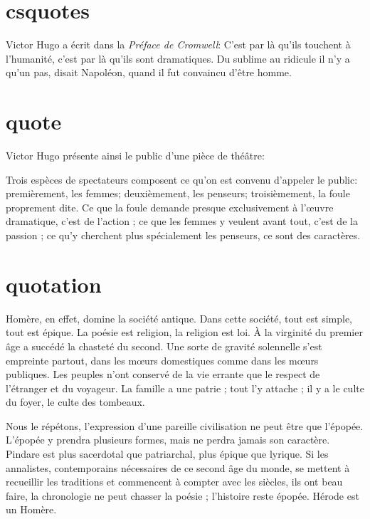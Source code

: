 \documentclass{book}
\begin{document}
\section{csquotes}

Victor Hugo a écrit dans la \emph{Préface de Cromwell}: C’est par là qu’ils touchent à l’humanité, c’est par là qu’ils sont dramatiques. Du sublime au ridicule il n’y a qu’un pas, disait Napoléon, quand il fut convaincu d’être homme.


\section{quote}


Victor Hugo présente ainsi le public d'une pièce de théâtre:

Trois espèces de spectateurs composent ce qu’on est convenu d’appeler le public: premièrement, les femmes; deuxièmement, les penseurs; troisièmement, la foule proprement dite. Ce que la foule demande presque exclusivement à l’œuvre dramatique, c’est de l’action ; ce que les femmes y veulent avant tout, c’est de la passion ; ce qu’y cherchent plus spécialement les penseurs, ce sont des caractères.


\section{quotation}

Homère, en effet, domine la société antique. Dans cette société, tout est simple, tout est épique. La poésie est religion, la religion est loi. À la virginité du premier âge a succédé la chasteté du second. Une sorte de gravité solennelle s’est empreinte partout, dans les mœurs domestiques comme dans les mœurs publiques. Les peuples n’ont conservé de la vie errante que le respect de l’étranger et du voyageur. La famille a une patrie ; tout l’y attache ; il y a le culte du foyer, le culte des tombeaux.

Nous le répétons, l’expression d’une pareille civilisation ne peut être que l’épopée. L’épopée y prendra plusieurs formes, mais ne perdra jamais son caractère. Pindare est plus sacerdotal que patriarchal, plus épique que lyrique. Si les annalistes, contemporains nécessaires de ce second âge du monde, se mettent à recueillir les traditions et commencent à compter avec les siècles, ils ont beau faire, la chronologie ne peut chasser la poésie ; l’histoire reste épopée. Hérode est un Homère.
\end{document}
